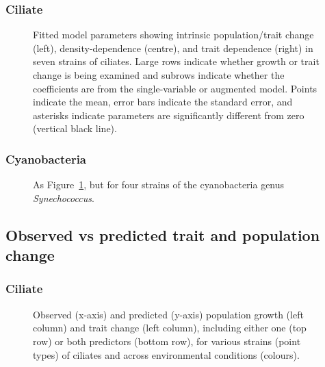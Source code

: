 \documentclass[
  letterpaper,
  DIV=11,
  numbers=noendperiod]{scrartcl}
\begin{document}
\subsubsection{Ciliate}\label{ciliate-3}

\begin{figure}


\caption{\label{fig-cilia-td-general}Fitted model parameters showing
intrinsic population/trait change (left), density-dependence (centre),
and trait dependence (right) in seven strains of ciliates. Large rows
indicate whether growth or trait change is being examined and subrows
indicate whether the coefficients are from the single-variable or
augmented model. Points indicate the mean, error bars indicate the
standard error, and asterisks indicate parameters are significantly
different from zero (vertical black line).}

\end{figure}%

\subsubsection{Cyanobacteria}\label{cyanobacteria-3}

\begin{figure}


\caption{\label{fig-cyano-td-general}As
Figure~\ref{fig-cilia-td-general}, but for four strains of the
cyanobacteria genus \emph{Synechococcus}.}

\end{figure}%

\subsection{Observed vs predicted trait and population
change}\label{observed-vs-predicted-trait-and-population-change}

\subsubsection{Ciliate}\label{ciliate-4}

\begin{figure}


\caption{\label{fig-cilia-growth-dtrait}Observed (x-axis) and predicted
(y-axis) population growth (left column) and trait change (left column),
including either one (top row) or both predictors (bottom row), for
various strains (point types) of ciliates and across environmental
conditions (colours).}

\end{figure}%
\end{document}
